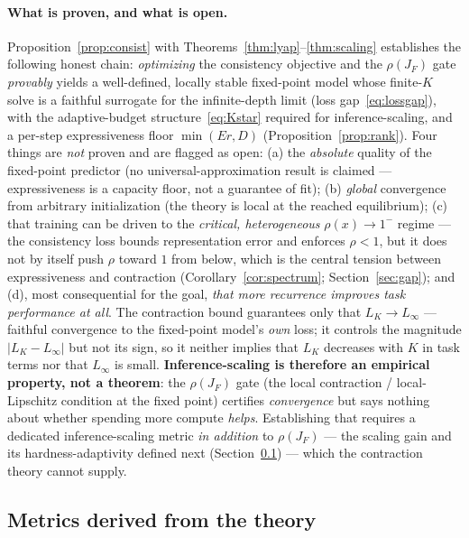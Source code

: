 \documentclass[11pt]{article}
\newcommand{\rhoF}{\rho(J_F)}
\begin{document}
\paragraph{What is proven, and what is open.}
Proposition~\ref{prop:consist} with Theorems~\ref{thm:lyap}--\ref{thm:scaling} establishes the
following honest chain: \emph{optimizing} the consistency objective and the $\rhoF$ gate
\emph{provably} yields a well-defined, locally stable fixed-point model whose finite-$K$ solve
is a faithful surrogate for the infinite-depth limit (loss gap~\eqref{eq:lossgap}), with the
adaptive-budget structure~\eqref{eq:Kstar} required for inference-scaling, and a per-step
expressiveness floor $\min(Er,D)$ (Proposition~\ref{prop:rank}).  Four things are
\emph{not} proven and are flagged as open: (a) the \emph{absolute} quality of the fixed-point
predictor (no universal-approximation result is claimed --- expressiveness is a capacity floor,
not a guarantee of fit); (b) \emph{global} convergence from arbitrary initialization (the
theory is local at the reached equilibrium); (c) that training can be driven to the
\emph{critical, heterogeneous} $\rho(x)\to1^-$ regime --- the consistency loss bounds
representation error and enforces $\rho<1$, but it does not by itself push $\rho$ toward $1$
from below, which is the central tension between expressiveness and contraction
(Corollary~\ref{cor:spectrum}; Section~\ref{sec:gap}); and (d), most consequential for the goal,
\emph{that more recurrence improves task performance at all}.  The contraction bound guarantees
only that $L_K\!\to\!L_\infty$ --- faithful convergence to the fixed-point model's \emph{own}
loss; it controls the magnitude $|L_K-L_\infty|$ but not its sign, so it neither implies that
$L_K$ decreases with $K$ in task terms nor that $L_\infty$ is small.  \textbf{Inference-scaling
is therefore an empirical property, not a theorem}: the $\rhoF$ gate (the local contraction /
local-Lipschitz condition at the fixed point) certifies \emph{convergence} but says nothing about
whether spending more compute \emph{helps}.  Establishing that requires a dedicated
inference-scaling metric \emph{in addition} to $\rhoF$ --- the scaling gain and its
hardness-adaptivity defined next (Section~\ref{sec:metrics}) --- which the contraction theory
cannot supply.

\subsection{Metrics derived from the theory}
\label{sec:metrics}
\end{document}
